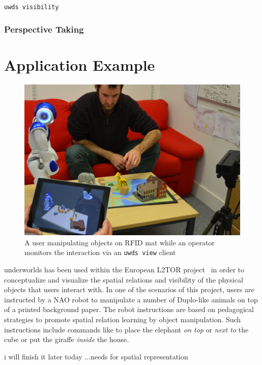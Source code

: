 \documentclass[letterpaper, 10 pt, conference]{ieeeconf}  %
\newcommand{\uwds}{{\sc underworlds}\xspace}
\begin{document}
{\tt uwds visibility}

\subsubsection{Perspective Taking}


\section{Application Example}

\begin{figure}
    \centering
    \includegraphics[width=\linewidth]{l2tor-photo2}
    \caption{A user manipulating objects on RFID mat while an operator monitors the interaction via an {\tt uwds view} client}
    \label{fig|l2torexample}
\end{figure}
\uwds has been used within the European L2TOR project~\cite{belpaeme2015l2tor} in order to conceptualize and visualize the spatial relations and visibility of the physical objects that users interact with. In one of the scenarios of this project, users are instructed by a NAO robot to manipulate a number of Duplo-like animals on top of a printed background paper. The robot instructions are based on pedagogical strategies to promote spatial relation learning by object manipulation. Such instructions include commands like to place the elephant \textit{on top} or \textit{next to} the cube or put the giraffe \textit{inside} the house.     

i will finish it later today
...needs for spatial representation
\end{document}
